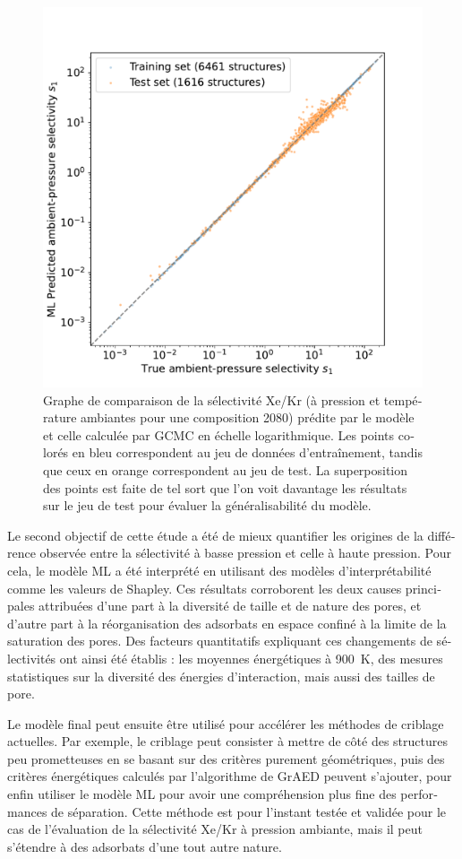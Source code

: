 \documentclass[thesis]{subfiles}
\begin{document}
\begin{otherlanguage}{french}
\begin{figure}[h!]
\centering
    \includegraphics[width=0.48\linewidth]{figures/4-ml/SI_figure/Scatterplot_S1_prediction_logscale.pdf}
    \caption{Graphe de comparaison de la sélectivité Xe/Kr (à pression et température ambiantes pour une composition 20\pp{}80) prédite par le modèle et celle calculée par GCMC en échelle logarithmique. Les points colorés en bleu correspondent au jeu de données d'entraînement, tandis que ceux en orange correspondent au jeu de test. La superposition des points est faite de tel sort que l'on voit davantage les résultats sur le jeu de test pour évaluer la généralisabilité du modèle.}\label{fgr:S1_prediction_resume}
\end{figure}

Le second objectif de cette étude a été de mieux quantifier les origines de la différence observée entre la sélectivité à basse pression et celle à haute pression. Pour cela, le modèle ML a été interprété en utilisant des modèles d'interprétabilité comme les valeurs de Shapley. Ces résultats corroborent les deux causes principales attribuées d'une part à la diversité de taille et de nature des pores, et d'autre part à la réorganisation des adsorbats en espace confiné à la limite de la saturation des pores. Des facteurs quantitatifs expliquant ces changements de sélectivités ont ainsi été établis : les moyennes énergétiques à \SI{900}{\kelvin}, des mesures statistiques sur la diversité des énergies d'interaction, mais aussi des tailles de pore. 

Le modèle final peut ensuite être utilisé pour accélérer les méthodes de criblage actuelles. Par exemple, le criblage peut consister à mettre de côté des structures peu prometteuses en se basant sur des critères purement géométriques, puis des critères énergétiques calculés par l'algorithme de GrAED peuvent s'ajouter, pour enfin utiliser le modèle ML pour avoir une compréhension plus fine des performances de séparation. Cette méthode est pour l'instant testée et validée pour le cas de l'évaluation de la sélectivité Xe/Kr à pression ambiante, mais il peut s'étendre à des adsorbats d'une tout autre nature. 


\end{otherlanguage}
\end{document}

